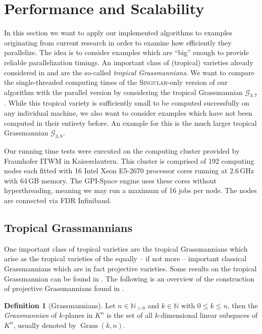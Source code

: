 \documentclass[
  paper=a4,
  titlepage,
  bibliography=totoc,
  pagesize=pdftex
]{scrartcl}
\numberwithin{figure}{section}
\numberwithin{equation}{section}
\numberwithin{table}{section}
\newcommand*\setN{\mathds{N}}
\DeclareMathOperator{\Grass}{Grass}
\theoremstyle{definition}
\newtheorem{definition}{Definition}
\numberwithin{definition}{section}
\begin{document}
\section{Performance and Scalability}

In this section we want to apply our implemented algorithms to examples originating from
current research in order to examine how efficiently they parallelize. The idea is to
consider examples which are \enquote{big} enough to provide reliable parallelization
timings. An important class of (tropical) varieties already considered in
\cite{tropPointsLinks} and \cite{tropGrass} are the so-called \emph{tropical
Grassmannians}. We want to compare the single-threaded computing times of the
\textsc{Singular}-only version of our algorithm with the parallel version by considering
the tropical Grassmannian $\mathcal G_{3,7}$. While this tropical variety is sufficiently
small to be computed successfully on any individual machine, we also want to consider
examples which have not been computed in their entirety before. An example for this is the
much larger tropical Grassmannian $\mathcal G_{3,8}$.

Our running time tests were executed on the computing cluster provided by Fraunhofer ITWM
in Kaiserslautern. This cluster is comprised of 192 computing nodes each fitted with 16
Intel Xeon E5-2670 processor cores running at 2.6\,GHz with 64\,GB memory. The GPI-Space
engine uses these cores without hyperthreading, meaning we may run a maximum of 16 jobs
per node. The nodes are connected via FDR Infiniband.

\subsection{Tropical Grassmannians}

One important class of tropical varieties are the tropical Grassmannians which arise as
the tropical varieties of the equally -- if not more -- important classical Grassmannians
which are in fact projective varieties. Some results on the tropical Grassmannian can be
found in \cite{tropGrass}. The following is an overview of the construction of projective
Grassmannians found in \cite[Section~8]{gathmAlgGeo}.

\begin{definition}[Grassmannians]
  Let $n \in \setN_{>0}$ and $k \in \setN$ with $0 \leq k \leq n$, then the
  \emph{Grassmannian} of $k$-planes in $K^n$ is the set of all $k$-dimensional linear
  subspaces of $K^n$, usually denoted by $\Grass(k, n)$.
\end{definition}
\end{document}

